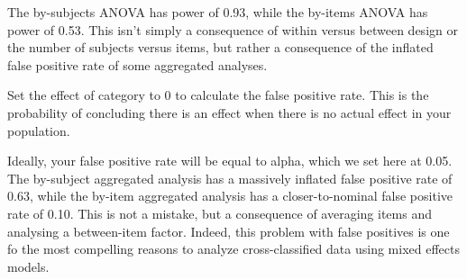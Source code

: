 \documentclass[doc,floatsintext]{apa6}
\newenvironment{Shaded}{\begin{snugshade}}{\end{snugshade}}
\newcommand{\KeywordTok}[1]{\textcolor[rgb]{0.13,0.29,0.53}{\textbf{#1}}}
\newcommand{\DataTypeTok}[1]{\textcolor[rgb]{0.13,0.29,0.53}{#1}}
\newcommand{\DecValTok}[1]{\textcolor[rgb]{0.00,0.00,0.81}{#1}}
\newcommand{\FloatTok}[1]{\textcolor[rgb]{0.00,0.00,0.81}{#1}}
\newcommand{\StringTok}[1]{\textcolor[rgb]{0.31,0.60,0.02}{#1}}
\newcommand{\CommentTok}[1]{\textcolor[rgb]{0.56,0.35,0.01}{\textit{#1}}}
\newcommand{\OperatorTok}[1]{\textcolor[rgb]{0.81,0.36,0.00}{\textbf{#1}}}
\newcommand{\NormalTok}[1]{#1}
\begin{document}
\begin{Shaded}
\end{Shaded}

The by-subjects ANOVA has power of 0.93, while the by-items ANOVA has
power of 0.53. This isn't simply a consequence of within versus between
design or the number of subjects versus items, but rather a consequence
of the inflated false positive rate of some aggregated analyses.

Set the effect of category to 0 to calculate the false positive rate.
This is the probability of concluding there is an effect when there is
no actual effect in your population.

\begin{Shaded}
\end{Shaded}

Ideally, your false positive rate will be equal to alpha, which we set
here at 0.05. The by-subject aggregated analysis has a massively
inflated false positive rate of 0.63, while the by-item aggregated
analysis has a closer-to-nominal false positive rate of 0.10. This is
not a mistake, but a consequence of averaging items and analysing a
between-item factor. Indeed, this problem with false positives is one fo
the most compelling reasons to analyze cross-classified data using mixed
effects models.
\end{document}
